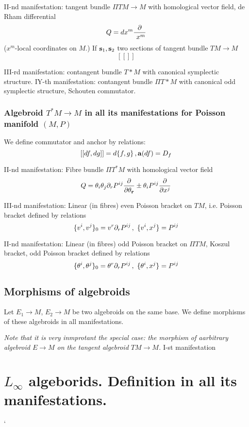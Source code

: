 \documentclass[12pt]{article}
\theoremstyle{theorem}
\numberwithin{equation}{section}
\begin{document}
  II-nd manifestation: tangent bundle $\Pi TM\to M$ with homological
vector field, de Rham differential
       \begin{equation*}
  Q=dx^m{\partial\over \ x^m}
        \end{equation*}
($x^m$-local coordinates on $M$.)
If ${\bf s}_1,{\bf s}_2$ two sections of tangent bundle $TM\to M$
        $$
[[]]
        $$

III-rd manifestation: contangent bundle $T*M$ with canonical symplectic 
structure.
IY-th manifestation: contangent bundle $\Pi T*M$ with canonical odd
symplectic structure, Schouten commutator.


  \subsubsection {Algebroid $T^*M\to M$ in all its manifestations
for Poisson manifold $(M,P)$}

  We define commutator and anchor by relations:
      $$
[[df,dg]]=d\{f,g\}\,, {\bf a}(df)=D_f
      $$


{II-nd manifestation}: 
Fibre bundle $\Pi T^*M$ with homological vector field
        \begin{equation*}\label{}         
  Q=\theta_i\theta_j\partial_r P^{ij}{\partial\over \partial \theta_{\bf r}}
   \pm\theta_iP^{ij}{\partial\over \partial x^j}       
 \end{equation*}


{III-nd manifestation}: Linear (in fibres) even Poisson bracket on $TM$,
i.e. Poisson bracket defined by relations
       $$
   \{v^i,v^j\}_0=v^r\partial_r P^{ij}\,,\,\, \{v^i,x^j\}=P^{ij}
       $$ 

{II-nd manifestation}:  Linear (in fibres) odd Poisson bracket on
          $\Pi TM$, Koszul bracket, odd Poisson 
bracket defined by relations
       $$
   \{\theta^i,\theta^j\}_0=\theta^r\partial_r P^{ij}\,,\,\, 
      \{\theta^i,x^j\}=P^{ij}
       $$ 

\subsection {Morphisms of algebroids}
  Let $E_1\to M$, $E_2\to M$ be two algebroids on the same base.
We define morphisms of these algebroids in all manifestations.


    {\sl Note that it is very inmprotant the special case: the morphism
of aarbitrary algebroid $E\to M$ on the tangent algebroid $TM\to M$.
}
 {I-st manifestation}


\section {$L_\infty$ algeborids. Definition in all its manifestations.}
`
 
\end{document}
